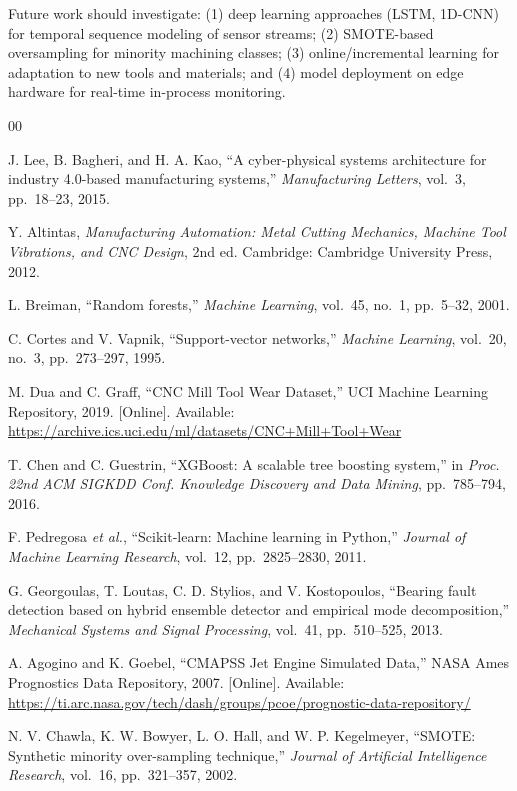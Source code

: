 \documentclass[conference]{IEEEtran}
\begin{document}
Future work should investigate: (1) deep learning approaches (LSTM, 1D-CNN) for
temporal sequence modeling of sensor streams; (2) SMOTE-based oversampling for
minority machining classes; (3) online/incremental learning for adaptation to new
tools and materials; and (4) model deployment on edge hardware for real-time
in-process monitoring.

\begin{thebibliography}{00}

J. Lee, B. Bagheri, and H. A. Kao, ``A cyber-physical systems architecture for industry
4.0-based manufacturing systems,'' \textit{Manufacturing Letters}, vol.~3, pp.~18--23,
2015.

Y. Altintas, \textit{Manufacturing Automation: Metal Cutting Mechanics, Machine Tool
Vibrations, and CNC Design}, 2nd ed. Cambridge: Cambridge University Press, 2012.

L. Breiman, ``Random forests,'' \textit{Machine Learning}, vol.~45, no.~1,
pp.~5--32, 2001.

C. Cortes and V. Vapnik, ``Support-vector networks,''
\textit{Machine Learning}, vol.~20, no.~3, pp.~273--297, 1995.

M. Dua and C. Graff, ``CNC Mill Tool Wear Dataset,''
UCI Machine Learning Repository, 2019. [Online]. Available:
\url{https://archive.ics.uci.edu/ml/datasets/CNC+Mill+Tool+Wear}

T. Chen and C. Guestrin, ``XGBoost: A scalable tree boosting system,''
in \textit{Proc. 22nd ACM SIGKDD Conf. Knowledge Discovery and Data Mining},
pp.~785--794, 2016.

F. Pedregosa \textit{et al.}, ``Scikit-learn: Machine learning in Python,''
\textit{Journal of Machine Learning Research}, vol.~12, pp.~2825--2830, 2011.

G. Georgoulas, T. Loutas, C. D. Stylios, and V. Kostopoulos, ``Bearing fault detection
based on hybrid ensemble detector and empirical mode decomposition,''
\textit{Mechanical Systems and Signal Processing}, vol.~41, pp.~510--525, 2013.

A. Agogino and K. Goebel, ``CMAPSS Jet Engine Simulated Data,''
NASA Ames Prognostics Data Repository, 2007. [Online]. Available:
\url{https://ti.arc.nasa.gov/tech/dash/groups/pcoe/prognostic-data-repository/}

N. V. Chawla, K. W. Bowyer, L. O. Hall, and W. P. Kegelmeyer,
``SMOTE: Synthetic minority over-sampling technique,''
\textit{Journal of Artificial Intelligence Research}, vol.~16, pp.~321--357, 2002.

\end{thebibliography}
\end{document}
